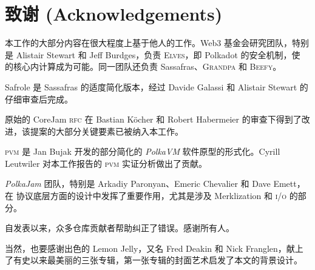 \section{致谢 (Acknowledgements)}

本工作的大部分内容在很大程度上基于他人的工作。Web3 基金会研究团队，特别是 Alistair Stewart 和 Jeff Burdges，负责 \textsc{Elves}，即 Polkadot 的安全机制，使 \Jam 的核心内计算成为可能。同一团队还负责 Sassafras、\textsc{Grandpa} 和 \textsc{Beefy}。

Safrole 是 Sassafras 的适度简化版本，经过 Davide Galassi 和 Alistair Stewart 的仔细审查后完成。

原始的 CoreJam \textsc{rfc} 在 Bastian Köcher 和 Robert Habermeier 的审查下得到了改进，该提案的大部分关键要素已被纳入本工作。

\textsc{pvm} 是 Jan Bujak 开发的部分简化的 \emph{PolkaVM} 软件原型的形式化。Cyrill Leutwiler 对本工作报告的 \textsc{pvm} 实证分析做出了贡献。

\emph{PolkaJam} 团队，特别是 Arkadiy Paronyan、Emeric Chevalier 和 Dave Emett，在 \Jam 协议底层方面的设计中发挥了重要作用，尤其是涉及 Merklization 和 \textsc{i/o} 的部分。

自发表以来，众多仓库贡献者帮助纠正了错误。感谢所有人。

当然，也要感谢出色的 Lemon Jelly，又名 Fred Deakin 和 Nick Franglen，献上了有史以来最美丽的三张专辑，第一张专辑的封面艺术启发了本文的背景设计。
